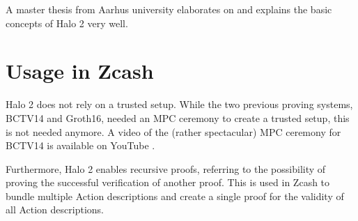 \documentclass{article}
\begin{document}
A master thesis from Aarhus university \cite{schmidt:halo2} elaborates on \cite{zcash:halo2} and explains the basic concepts of Halo 2 very well.

\section{Usage in Zcash}

Halo 2 does not rely on a trusted setup.
While the two previous proving systems, BCTV14 and Groth16, needed an MPC ceremony to create a trusted setup, this is not needed anymore.
A video of the (rather spectacular) MPC ceremony for BCTV14 is available on YouTube \cite{bctv14-setup}.

Furthermore, Halo 2 enables recursive proofs, referring to the possibility of proving the successful verification of another proof.
This is used in Zcash to bundle multiple Action descriptions and create a single proof for the validity of all Action descriptions.



\end{document}
